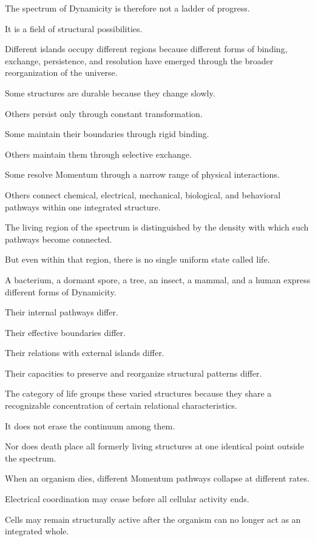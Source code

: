 The spectrum of Dynamicity is therefore not a ladder of progress.

It is a field of structural possibilities.

Different islands occupy different regions because different forms of binding, exchange, persistence, and resolution have emerged through the broader reorganization of the universe.

Some structures are durable because they change slowly.

Others persist only through constant transformation.

Some maintain their boundaries through rigid binding.

Others maintain them through selective exchange.

Some resolve Momentum through a narrow range of physical interactions.

Others connect chemical, electrical, mechanical, biological, and behavioral pathways within one integrated structure.

The living region of the spectrum is distinguished by the density with which such pathways become connected.

But even within that region, there is no single uniform state called life.

A bacterium, a dormant spore, a tree, an insect, a mammal, and a human express different forms of Dynamicity.

Their internal pathways differ.

Their effective boundaries differ.

Their relations with external islands differ.

Their capacities to preserve and reorganize structural patterns differ.

The category of life groups these varied structures because they share a recognizable concentration of certain relational characteristics.

It does not erase the continuum among them.

Nor does death place all formerly living structures at one identical point outside the spectrum.

When an organism dies, different Momentum pathways collapse at different rates.

Electrical coordination may cease before all cellular activity ends.

Cells may remain structurally active after the organism can no longer act as an integrated whole.

